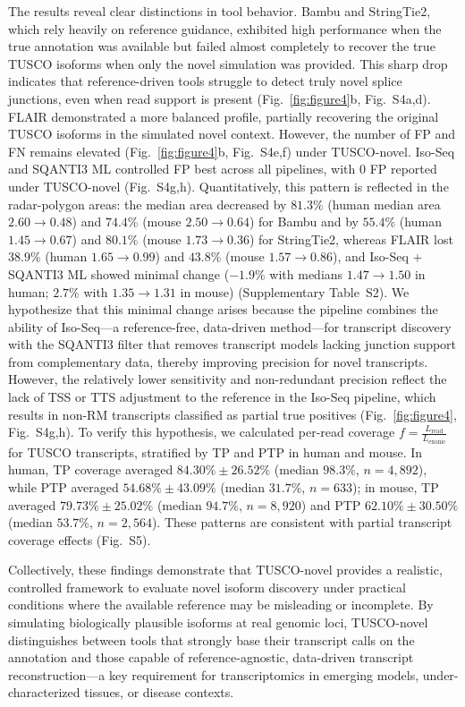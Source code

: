 \documentclass[pdflatex,sn-nature]{sn-jnl}%
\begin{document}
The results reveal clear distinctions in tool behavior. Bambu and StringTie2, which rely heavily on reference guidance, exhibited high performance when the true annotation was available but failed almost completely to recover the true TUSCO isoforms when only the novel simulation was provided. This sharp drop indicates that reference-driven tools struggle to detect truly novel splice junctions, even when read support is present (Fig.~\ref{fig:figure4}b, Fig.~S4a,d). FLAIR demonstrated a more balanced profile, partially recovering the original TUSCO isoforms in the simulated novel context. However, the number of FP and FN remains elevated (Fig.~\ref{fig:figure4}b, Fig.~S4e,f) under TUSCO-novel. Iso-Seq and SQANTI3 ML controlled FP best across all pipelines, with 0 FP reported under TUSCO-novel (Fig.~S4g,h). Quantitatively, this pattern is reflected in the radar-polygon areas: the median area decreased by $81.3\%$ (human median area $2.60 \to 0.48$) and $74.4\%$ (mouse $2.50 \to 0.64$) for Bambu and by $55.4\%$ (human $1.45 \to 0.67$) and $80.1\%$ (mouse $1.73 \to 0.36$) for StringTie2, whereas FLAIR lost $38.9\%$ (human $1.65 \to 0.99$) and $43.8\%$ (mouse $1.57 \to 0.86$), and Iso-Seq + SQANTI3 ML showed minimal change ($-1.9\%$ with medians $1.47 \to 1.50$ in human; $2.7\%$ with $1.35 \to 1.31$ in mouse) (Supplementary Table~S2). We hypothesize that this minimal change arises because the pipeline combines the ability of Iso-Seq---a reference-free, data-driven method---for transcript discovery with the SQANTI3 filter that removes transcript models lacking junction support from complementary data, thereby improving precision for novel transcripts. However, the relatively lower sensitivity and non-redundant precision reflect the lack of TSS or TTS adjustment to the reference in the Iso-Seq pipeline, which results in non-RM transcripts classified as partial true positives (Fig.~\ref{fig:figure4}, Fig.~S4g,h). To verify this hypothesis, we calculated per-read coverage $f = \frac{L_{\mathrm{read}}}{L_{\mathrm{exonic}}}$ for TUSCO transcripts, stratified by TP and PTP in human and mouse. In human, TP coverage averaged $84.30\% \pm 26.52\%$ (median $98.3\%$, $n = 4,892$), while PTP averaged $54.68\% \pm 43.09\%$ (median $31.7\%$, $n = 633$); in mouse, TP averaged $79.73\% \pm 25.02\%$ (median $94.7\%$, $n = 8,920$) and PTP $62.10\% \pm 30.50\%$ (median $53.7\%$, $n = 2,564$). These patterns are consistent with partial transcript coverage effects (Fig.~S5).

Collectively, these findings demonstrate that TUSCO-novel provides a realistic, controlled framework to evaluate novel isoform discovery under practical conditions where the available reference may be misleading or incomplete. By simulating biologically plausible isoforms at real genomic loci, TUSCO-novel distinguishes between tools that strongly base their transcript calls on the annotation and those capable of reference-agnostic, data-driven transcript reconstruction---a key requirement for transcriptomics in emerging models, under-characterized tissues, or disease contexts.
\end{document}
